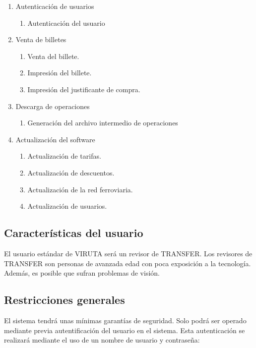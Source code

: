 \begin{enumerate}
\item Autenticación de usuarios
	\begin{enumerate}
	\item Autenticación del usuario
	\end{enumerate}
\item Venta de billetes
	\begin{enumerate}
	\item Venta del billete.
	\item Impresión del billete.
	\item Impresión del justificante de compra.
	\end{enumerate}
\item Descarga de operaciones
	\begin{enumerate}
	\item Generación del archivo intermedio de operaciones
	\end{enumerate}
\item Actualización del software
	\begin{enumerate}
	\item Actualización de tarifas.
	\item Actualización de descuentos.
	\item Actualización de la red ferroviaria.
	\item Actualización de usuarios.
	\end{enumerate}
\end{enumerate}

\subsection{Características del usuario}

El usuario estándar de VIRUTA será un revisor de TRANSFER. Los revisores de TRANSFER son personas de avanzada edad con poca exposición a la tecnología. Además, es posible que sufran problemas de visión.

\subsection{Restricciones generales}

El sistema tendrá unas mínimas garantías de seguridad. Solo podrá ser operado mediante previa autentificación del usuario en el sistema. Esta autenticación se realizará mediante el uso de un nombre de usuario y contraseña:\\

